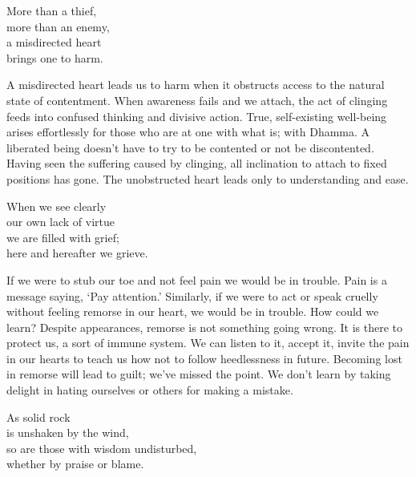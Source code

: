 
\begin{dhpVerse}{42}
\label{dhp-42}
More than a thief,\\
more than an enemy,\\
a misdirected heart\\
brings one to harm.
\end{dhpVerse}

\begin{dhpRefl}
  A misdirected heart leads us to harm when it obstructs access to the natural
  state of contentment. When awareness fails and we attach, the act of clinging
  feeds into confused thinking and divisive action. True, self-existing
  well-being arises effortlessly for those who are at one with what is; with
  Dhamma. A liberated being doesn't have to try to be contented or not be
  discontented. Having seen the suffering caused by clinging, all inclination to
  attach to fixed positions has gone. The unobstructed heart leads only to
  understanding and ease.
\end{dhpRefl}


\begin{dhpVerse}{15}
\label{dhp-15}
When we see clearly\\
our own lack of virtue\\
we are filled with grief;\\
here and hereafter we grieve.
\end{dhpVerse}

\begin{dhpRefl}
  If we were to stub our toe and not feel pain we would be in trouble. Pain is a
  message saying, ‘Pay attention.' Similarly, if we were to act or speak cruelly
  without feeling remorse in our heart, we would be in trouble. How could we
  learn? Despite appearances, remorse is not something going wrong. It is there
  to protect us, a sort of immune system. We can listen to it, accept it, invite
  the pain in our hearts to teach us how not to follow heedlessness in future.
  Becoming lost in remorse will lead to guilt; we've missed the point. We don’t
  learn by taking delight in hating ourselves or others for making a mistake.
\end{dhpRefl}


\begin{dhpVerse}{81}
\label{dhp-81}
As solid rock\\
is unshaken by the wind,\\
so are those with wisdom undisturbed,\\
whether by praise or blame. 
\end{dhpVerse}


